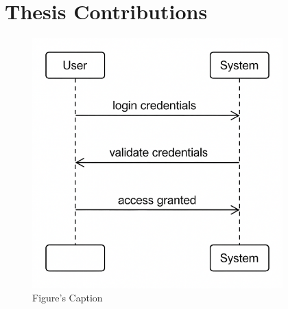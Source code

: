 \section{Thesis Contributions}
\label{sec:intro:contribution}


\lipsum[1-2]

\begin{figure}[htbp]
    \centering
    \includegraphics[width=0.86\textwidth]{figures/myfigure.png}
    \caption{Figure's Caption}
    \label{fig:myfigure}
\end{figure}


\lipsum[3-4]
